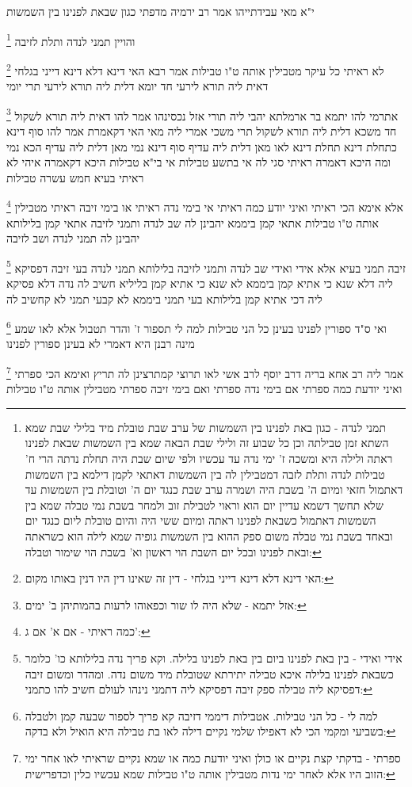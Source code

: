 \documentclass[12pt, openany]{book}
\newcommand{\footnotecomment}[1]{
	\renewcommand\thefootnote{}
	\footnote{#1}}
\newcommand{\commenta}[1]{\footnotecomment{#1}}
\begin{document}
{י"א מאי עבידתייהו אמר רב ירמיה מדפתי כגון שבאת לפנינו בין השמשות
\commenta{תמני לנדה - כגון באת לפנינו בין השמשות של ערב שבת טובלת מיד בלילי שבת שמא השתא זמן טבילתה וכן כל שבוע זה ולילי שבת הבאה שמא בין השמשות שבאת לפנינו ראתה ולילה היא ומשכה ז' ימי נדה עד עכשיו ולפי שיום שבת היה תחלת נדתה הרי ח' טבילות לנדה ותלת לזבה דמטבילין לה בין השמשות דאתאי לקמן דילמא בין השמשות דאתמול חזאי ומיום ה' בשבת היה ושמרה ערב שבת כנגד יום ה' וטובלת בין השמשות עד שלא תחשך דשמא עדיין יום הוא וראוי לטבילת זוב ולמחר בשבת נמי טבלה שמא בין השמשות דאתמול כשבאת לפנינו ראתה ומיום ששי היה והיום טובלת ליום כנגד יום ובאחד בשבת נמי טבלה משום ספק ההוא בין השמשות גופיה שמא לילה הוא כשראתה ובאת לפנינו ובכל יום השבת הוי ראשון וא' בשבת הוי שימור וטבלה:}
והויין תמני לנדה ותלת לזיבה 
\commenta{האי דינא דלא דינא דייני בגלחי - דין זה שאינו דין היו דנין באותו מקום:}
לא ראיתי כל עיקר מטבילין אותה ט"ו טבילות אמר רבא האי דינא דלא דינא דייני בגלחי דאית ליה תורא לירעי חד יומא דלית ליה תורא לירעי תרי יומי 
\commenta{אזל יתמא - שלא היה לו שור וכפאוהו לרעות בהמותיהן ב' ימים:}
אתרמי להו יתמא בר ארמלתא יהבי ליה תורי אזל נכסינהו אמר להו דאית ליה תורא לשקול חד משכא דלית ליה תורא לשקול תרי משכי אמרי ליה מאי האי דקאמרת אמר להו סוף דינא כתחלת דינא תחלת דינא לאו מאן דלית ליה עדיף סוף דינא נמי מאן דלית ליה עדיף 
הכא נמי ומה היכא דאמרה ראיתי סגי לה אי בתשע טבילות אי בי"א טבילות היכא דקאמרה איהי לא ראיתי בעיא חמש עשרה טבילות 
\commenta{כמה ראיתי - אם א' אם ג':}
אלא אימא הכי ראיתי ואיני יודע כמה ראיתי אי בימי נדה ראיתי או בימי זיבה ראיתי מטבילין אותה ט"ו טבילות אתאי קמן ביממא יהבינן לה שב לנדה
ותמני לזיבה אתאי קמן בלילותא יהבינן לה תמני לנדה ושב לזיבה
\commenta{אידי ואידי - בין באת לפנינו ביום בין באת לפנינו בלילה. וקא פריך נדה בלילותא כו' כלומר כשבאת לפנינו בלילה איכא טבילה יתירתא שטובלת מיד משום נדה. ומהדר ומשום זיבה דפסיקא ליה טבילה ספק זיבה דפסיקא ליה דתמני נינהו לעולם חשיב להו כתמני:}
זיבה תמני בעיא אלא אידי ואידי שב לנדה ותמני לזיבה
בלילותא תמני לנדה בעי 
זיבה דפסיקא ליה דלא שנא כי אתיא קמן ביממא לא שנא כי אתיא קמן בליליא חשיב לה נדה דלא פסיקא ליה דכי אתיא קמן בלילותא בעי תמני ביממא לא קבעי תמני לא קחשיב לה 
\commenta{למה לי - כל הני טבילות. אטבילות דיממי דזיבה קא פריך לספור שבעה קמן ולטבלה בשביעי ומקמי הכי לא דאפילו שלמי נקיים דילה לאו בת טבילה היא הואיל ולא בדקה:}
ואי ס"ד ספורין לפנינו בעינן כל הני טבילות למה לי תספור ז' והדר תטבול אלא לאו שמע מינה רבנן היא דאמרי לא בעינן ספורין לפנינו 
\commenta{ספרתי - בדקתי קצת נקיים או כולן ואיני יודעת כמה או שמא נקיים שראיתי לאו אחר ימי הזוב היו אלא לאחר ימי נדות מטבילין אותה ט"ו טבילות שמא עכשיו כלין וכדפרישית:}
אמר ליה רב אחא בריה דרב יוסף לרב אשי לאו תרוצי קמתרצינן לה תריץ ואימא הכי ספרתי ואיני יודעת כמה ספרתי אם בימי נדה ספרתי ואם בימי זיבה ספרתי מטבילין אותה ט"ו טבילות 
}
\end{document}
